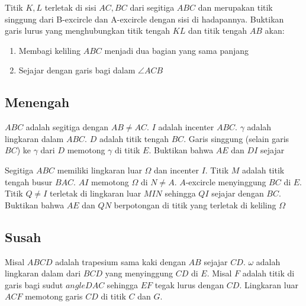\documentclass[11pt]{scrartcl}
\begin{document}
\begin{problem}
     Titik $K, L$ terletak di sisi $AC, BC$ dari segitiga $ABC$ dan merupakan titik singgung dari B-excircle dan A-excircle dengan sisi di hadapannya. Buktikan garis lurus yang menghubungkan titik tengah $KL$ dan titik tengah $AB$ akan:
    \begin{enumerate}
        \item Membagi keliling $ABC$ menjadi dua bagian yang sama panjang
        \item Sejajar dengan garis bagi dalam $\angle{ACB}$
    \end{enumerate}
\end{problem}

\subsection{Menengah}
\begin{problem}
    [Spanyol 2021] $ABC$ adalah segitiga dengan $AB \neq AC$. $I$ adalah incenter $ABC$. $\gamma$ adalah lingkaran dalam $ABC$. $D$ adalah titik tengah $BC$. Garis singgung (selain garis $BC$) ke $\gamma$ dari $D$ memotong $\gamma$ di titik $E$. Buktikan bahwa $AE$ dan $DI$ sejajar
\end{problem}

\begin{problem}
     Segitiga $ABC$ memiliki lingkaran luar $\Omega$ dan incenter $I$. Titik $M$ adalah titik tengah busur $BAC$. $AI$ memotong $\Omega$ di $N \neq A$. $A$-excircle menyinggung $BC$ di $E$. Titik $Q \neq I$ terletak di lingkaran luar $MIN$ sehingga $QI$ sejajar dengan $BC$. Buktikan bahwa $AE$ dan $QN$ berpotongan di titik yang terletak di keliling $\Omega$    
\end{problem}

\subsection{Susah}
\begin{problem}
    [USAMO 1999] Misal $ABCD$ adalah trapesium sama kaki dengan $AB$ sejajar $CD$. $\omega$ adalah lingkaran dalam dari $BCD$ yang menyinggung $CD$ di $E$. Misal $F$ adalah titik di garis bagi sudut $angle{DAC}$ sehingga $EF$ tegak lurus dengan $CD$. Lingkaran luar $ACF$ memotong garis $CD$ di titik $C$ dan $G$. 
\end{problem}
\end{document}
